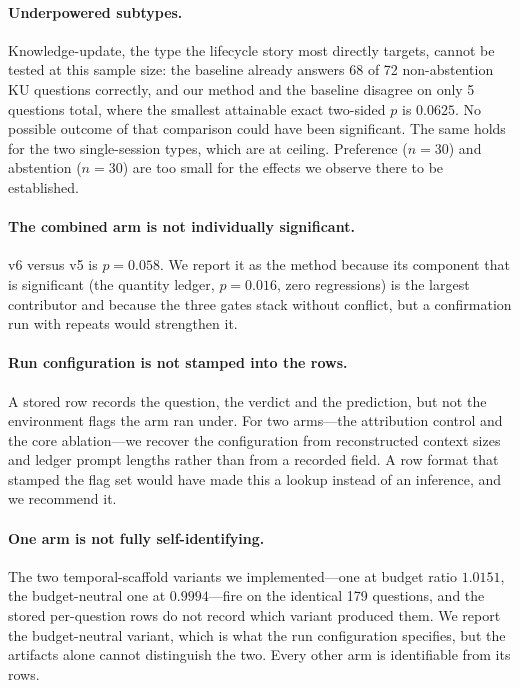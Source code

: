 \documentclass[11pt]{article}
\begin{document}
\paragraph{Underpowered subtypes.} Knowledge-update, the type the lifecycle story most directly targets, cannot be tested at this sample size: the baseline already answers 68 of 72 non-abstention KU questions correctly, and our method and the baseline disagree on only 5 questions total, where the smallest attainable exact two-sided $p$ is $0.0625$. No possible outcome of that comparison could have been significant. The same holds for the two single-session types, which are at ceiling. Preference ($n = 30$) and abstention ($n = 30$) are too small for the effects we observe there to be established.

\paragraph{The combined arm is not individually significant.} v6 versus v5 is $p = 0.058$. We report it as the method because its component that is significant (the quantity ledger, $p = 0.016$, zero regressions) is the largest contributor and because the three gates stack without conflict, but a confirmation run with repeats would strengthen it.

\paragraph{Run configuration is not stamped into the rows.} A stored row records the question, the verdict and the prediction, but not the environment flags the arm ran under. For two arms---the attribution control and the core ablation---we recover the configuration from reconstructed context sizes and ledger prompt lengths rather than from a recorded field. A row format that stamped the flag set would have made this a lookup instead of an inference, and we recommend it.

\paragraph{One arm is not fully self-identifying.} The two temporal-scaffold variants we implemented---one at budget ratio $1.0151$, the budget-neutral one at $0.9994$---fire on the identical 179 questions, and the stored per-question rows do not record which variant produced them. We report the budget-neutral variant, which is what the run configuration specifies, but the artifacts alone cannot distinguish the two. Every other arm is identifiable from its rows.
\end{document}
